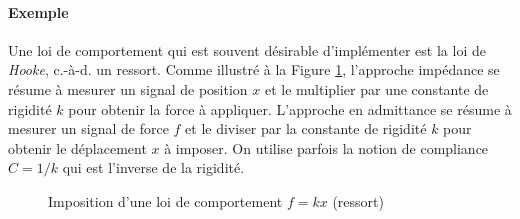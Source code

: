\paragraph{Exemple} Une loi de comportement qui est souvent désirable d'implémenter est la loi de \textit{Hooke}, c.-à-d. un ressort. Comme illustré à la Figure \ref{fig:impedanceadmitancespring}, l'approche impédance se résume à mesurer un signal de position $x$ et le multiplier par une constante de rigidité $k$ pour obtenir la force à appliquer. L'approche en admittance se résume à mesurer un signal de force $f$ et le diviser par la constante de rigidité $k$ pour obtenir le déplacement $x$ à imposer. On utilise parfois la notion de compliance $C=1/k$ qui est l'inverse de la rigidité.
\begin{figure}[H]
	\vspace{-10pt}
	\centering
	\hspace{5pt}
	\caption{Imposition d'une loi de comportement $f=kx$ (ressort)}
	\label{fig:impedanceadmitancespring}
\end{figure}

